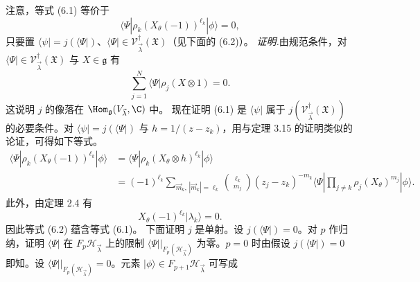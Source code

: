 注意，等式 (6.1) 等价于
\[
\langle\Psi|\rho_k(X_\theta(-1))^{\ell_k}|\phi\rangle=0,
\]
只要置 $\langle\psi|=j(\langle\Psi|)$、$\langle\Psi|\in\mathcal{V}^{\dagger}_{\vec\lambda}(\mathfrak{X})$（见下面的 (6.2)）。
\noindent\textit{证明.}\quad 由规范条件，对 $\langle\Psi|\in\mathcal{V}^{\dagger}_{\vec\lambda}(\mathfrak{X})$ 与 $X\in\mathfrak{g}$ 有
\[
\sum_{j=1}^{N}\langle\Psi|\rho_j(X\otimes 1)=0.
\]
这说明 $j$ 的像落在 $\Hom_{\mathfrak{g}}(V_{\vec\lambda},\C)$ 中。
现在证明 (6.1) 是 $\langle\psi|$ 属于 $j(\mathcal{V}^{\dagger}_{\vec\lambda}(\mathfrak{X}))$ 的必要条件。对 $\langle\psi|=j(\langle\Psi|)$ 与 $h=1/(z-z_k)$，用与定理 3.15 的证明类似的论证，可得如下等式。
\begin{align}
\langle\Psi|\rho_k(X_\theta(-1))^{\ell_k}|\phi\rangle
&=\langle\Psi|\rho_k(X_\theta\otimes h)^{\ell_k}|\phi\rangle\nonumber\\
&=(-1)^{\ell_k}\sum_{\vec m_k,\,|\vec m_k|=\ell_k}\binom{\ell_k}{m_j}(z_j-z_k)^{-m_k}\langle\Psi|\prod_{j\ne k}\rho_j(X_\theta)^{m_j}|\phi\rangle.\tag{6.2}
\end{align}
此外，由定理 2.4 有
\[
X_\theta(-1)^{\ell_k}|\lambda_k\rangle=0.
\]
因此等式 (6.2) 蕴含等式 (6.1)。
下面证明 $j$ 是单射。设 $j(\langle\Psi|)=0$。对 $p$ 作归纳，证明 $\langle\Psi|$ 在 $F_p\mathcal{H}_{\vec\lambda}$ 上的限制 $\langle\Psi|\big|_{F_p(\mathcal{H}_{\vec\lambda})}$ 为零。$p=0$ 时由假设 $j(\langle\Psi|)=0$ 即知。设 $\langle\Psi|\big|_{F_p(\mathcal{H}_{\vec\lambda})}=0$。元素 $|\phi\rangle\in F_{p+1}\mathcal{H}_{\vec\lambda}$ 可写成
